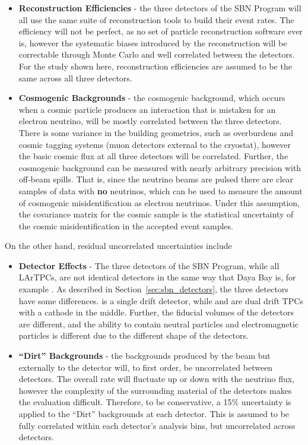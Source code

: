\begin{itemize}
  \item {\bf Reconstruction Efficiencies} - the three detectors of the SBN Program will all use the same suite of reconstruction tools to build their event rates.  The efficiency will not be perfect, as no set of particle reconstruction software ever is, however the systematic biases introduced by the reconstruction will be correctable through Monte Carlo and well correlated between the detectors.  For the study shown here, reconstruction efficiencies are assumed to be the same across all three detectors.
  \item{\bf Cosmogenic Backgrounds} - the cosmogenic background, which occurs when a cosmic particle produces an interaction that is mistaken for an electron neutrino, will be mostly correlated between the three detectors.  There is some variance in the building geometries, such as overburdens and cosmic tagging systems (muon detectors external to the cryostat), however the basic cosmic flux at all three detectors will be correlated.  Further, the cosmogenic background can be measured with nearly arbitrary precision with off-beam spills.  That is, since the neutrino beams are pulsed there are clear samples of data with {\bf no} neutrinos, which can be used to measure the amount of cosmogenic misidentification as electron neutrinos.  Under this assumption, the covariance matrix for the cosmic sample is the statistical uncertainty of the cosmic misidentification in the accepted event samples.

\end{itemize}

On the other hand, residual uncorrelated uncertainties include

\begin{itemize}
  \item {\bf Detector Effects} - The three detectors of the SBN Program, while all LArTPCs, are not identical detectors in the same way that Daya Bay is, for example \cite{daya_bay}.  As described in Section~\ref{sec:sbn_detectors}, the three detectors have some differences.  \uboone is a single drift detector, while \icarus and \sbnd are dual drift TPCs with a cathode in the middle.  Further, the fiducial volumes of the detectors are different, and the ability to contain neutral particles and electromagnetic particles is different due to the different shape of the detectors.
  \item{\bf ``Dirt'' Backgrounds} - the backgrounds produced by the beam but externally to the detector will, to first order, be uncorrelated between detectors.  The overall rate will fluctuate up or down with the neutrino flux, however the complexity of the surrounding material of the detectors makes the evaluation difficult.  Therefore, to be conservative, a 15\% uncertainty is applied to the ``Dirt'' backgrounds at each detector.  This is assumed to be fully correlated within each detector's analysis bins, but uncorrelated across detectors.
\end{itemize}

